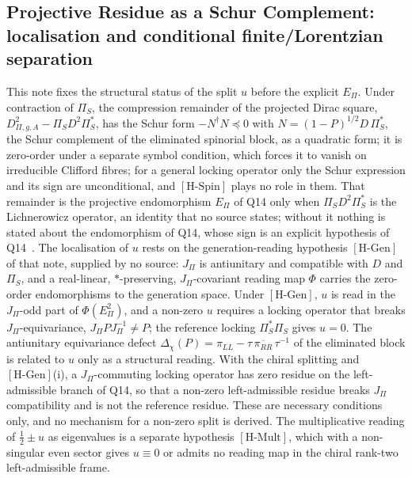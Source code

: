 \documentclass[11pt,a4paper]{article}
\theoremstyle{definition}
\newcommand{\Epi}{E_\Pi}
\newcommand{\Dpi}{D_{\Pi,g,A}}
\newcommand{\HSpin}{\ensuremath{[\mathrm{H\text{-}Spin}]}}
\newcommand{\HGen}{\ensuremath{[\mathrm{H\text{-}Gen}]}}
\newcommand{\HMult}{\ensuremath{[\mathrm{H\text{-}Mult}]}}
\begin{document}
    \subsection[Projective Residue as a Schur Complement]{Projective Residue as a Schur Complement: localisation and conditional finite/Lorentzian
    separation~\cite{Beau2026prs}}
      This note fixes the structural status of the split $u$ before the explicit $\Epi$.
      Under contraction of $\Pi_S$, the compression remainder of the projected Dirac square,
      $\Dpi^{2}-\Pi_S D^2\Pi_S^{*}$, has the Schur form $-N^{\dagger}N\preceq0$ with $N=(1-P)^{1/2}D\,\Pi_S^{*}$,
      the Schur complement of the eliminated spinorial block, as a quadratic form; it is zero-order under a separate
      symbol condition, which forces it to vanish on irreducible Clifford fibres; for a general locking operator only
      the Schur expression and its sign are unconditional, and \HSpin{} plays no role in them.
      That remainder is the projective endomorphism $\Epi$ of Q14 only when $\Pi_S D^2\Pi_S^{*}$ is the Lichnerowicz
      operator, an identity that no source states; without it nothing is stated about the endomorphism of Q14, whose
      sign is an explicit hypothesis of Q14~\cite{Beau2026q14}.
      The localisation of $u$ rests on the generation-reading hypothesis \HGen{} of that note, supplied by no source:
      $J_\Pi$ is antiunitary and compatible with $D$ and $\Pi_S$, and a real-linear, $*$-preserving, $J_\Pi$-covariant
      reading map $\Phi$ carries the zero-order endomorphisms to the generation space.
      Under \HGen{}, $u$ is read in the $J_\Pi$-odd part of $\Phi(\Epi^2)$, and a non-zero $u$ requires a locking
      operator that breaks $J_\Pi$-equivariance, $J_\Pi PJ_\Pi^{-1}\neq P$; the reference locking $\Pi_S^{*}\Pi_S$ gives
      $u=0$.
      The antiunitary equivariance defect $\Delta_\chi(P)=\pi_{LL}-\tau\,\overline{\pi_{RR}}\,\tau^{-1}$ of the
      eliminated block is related to $u$ only as a structural reading.
      With the chiral splitting and \HGen{}(i), a $J_\Pi$-commuting locking operator has zero residue on the left-admissible branch of
      Q14, so that a non-zero left-admissible residue breaks $J_\Pi$ compatibility and is not the reference residue.
      These are necessary conditions only, and no mechanism for a non-zero split is derived.
      The multiplicative reading of $\tfrac12\pm u$ as eigenvalues is a separate hypothesis \HMult{}, which with a
      non-singular even sector gives $u\equiv0$ or admits no reading map in the chiral rank-two left-admissible frame.
\end{document}
